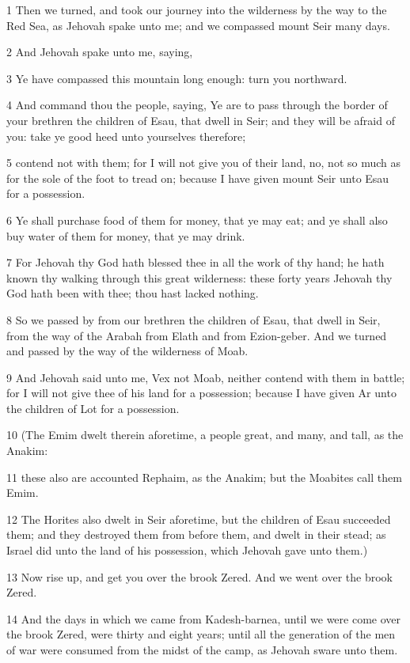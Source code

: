 \par 1 Then we turned, and took our journey into the wilderness by the way to the Red Sea, as Jehovah spake unto me; and we compassed mount Seir many days.
\par 2 And Jehovah spake unto me, saying,
\par 3 Ye have compassed this mountain long enough: turn you northward.
\par 4 And command thou the people, saying, Ye are to pass through the border of your brethren the children of Esau, that dwell in Seir; and they will be afraid of you: take ye good heed unto yourselves therefore;
\par 5 contend not with them; for I will not give you of their land, no, not so much as for the sole of the foot to tread on; because I have given mount Seir unto Esau for a possession.
\par 6 Ye shall purchase food of them for money, that ye may eat; and ye shall also buy water of them for money, that ye may drink.
\par 7 For Jehovah thy God hath blessed thee in all the work of thy hand; he hath known thy walking through this great wilderness: these forty years Jehovah thy God hath been with thee; thou hast lacked nothing.
\par 8 So we passed by from our brethren the children of Esau, that dwell in Seir, from the way of the Arabah from Elath and from Ezion-geber. And we turned and passed by the way of the wilderness of Moab.
\par 9 And Jehovah said unto me, Vex not Moab, neither contend with them in battle; for I will not give thee of his land for a possession; because I have given Ar unto the children of Lot for a possession.
\par 10 (The Emim dwelt therein aforetime, a people great, and many, and tall, as the Anakim:
\par 11 these also are accounted Rephaim, as the Anakim; but the Moabites call them Emim.
\par 12 The Horites also dwelt in Seir aforetime, but the children of Esau succeeded them; and they destroyed them from before them, and dwelt in their stead; as Israel did unto the land of his possession, which Jehovah gave unto them.)
\par 13 Now rise up, and get you over the brook Zered. And we went over the brook Zered.
\par 14 And the days in which we came from Kadesh-barnea, until we were come over the brook Zered, were thirty and eight years; until all the generation of the men of war were consumed from the midst of the camp, as Jehovah sware unto them.

